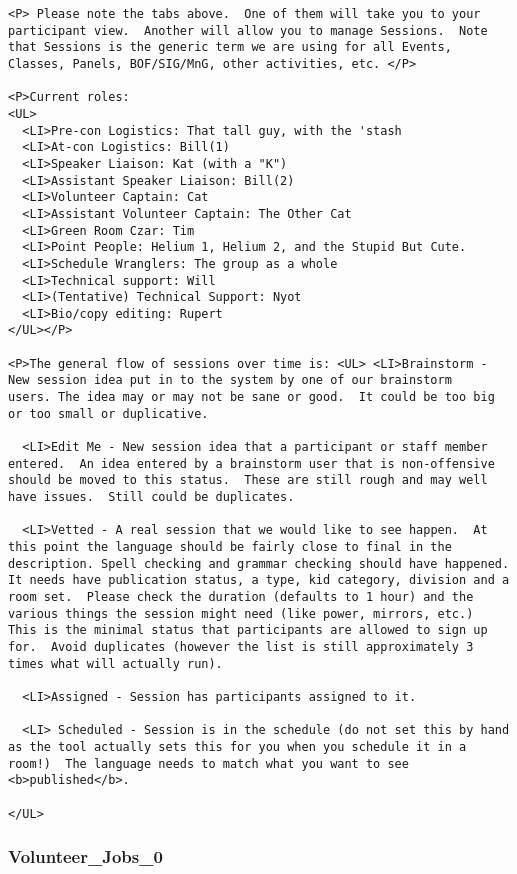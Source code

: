 \documentclass[tablesignature]{scrartcl}
\begin{document}
\begin{verbatim}
<P> Please note the tabs above.  One of them will take you to your
participant view.  Another will allow you to manage Sessions.  Note
that Sessions is the generic term we are using for all Events,
Classes, Panels, BOF/SIG/MnG, other activities, etc. </P>

<P>Current roles:
<UL>
  <LI>Pre-con Logistics: That tall guy, with the 'stash
  <LI>At-con Logistics: Bill(1)
  <LI>Speaker Liaison: Kat (with a "K")
  <LI>Assistant Speaker Liaison: Bill(2)
  <LI>Volunteer Captain: Cat
  <LI>Assistant Volunteer Captain: The Other Cat
  <LI>Green Room Czar: Tim
  <LI>Point People: Helium 1, Helium 2, and the Stupid But Cute.
  <LI>Schedule Wranglers: The group as a whole
  <LI>Technical support: Will
  <LI>(Tentative) Technical Support: Nyot
  <LI>Bio/copy editing: Rupert
</UL></P>

<P>The general flow of sessions over time is: <UL> <LI>Brainstorm -
New session idea put in to the system by one of our brainstorm
users. The idea may or may not be sane or good.  It could be too big
or too small or duplicative.

  <LI>Edit Me - New session idea that a participant or staff member
entered.  An idea entered by a brainstorm user that is non-offensive
should be moved to this status.  These are still rough and may well
have issues.  Still could be duplicates.

  <LI>Vetted - A real session that we would like to see happen.  At
this point the language should be fairly close to final in the
description. Spell checking and grammar checking should have happened.
It needs have publication status, a type, kid category, division and a
room set.  Please check the duration (defaults to 1 hour) and the
various things the session might need (like power, mirrors, etc.)
This is the minimal status that participants are allowed to sign up
for.  Avoid duplicates (however the list is still approximately 3
times what will actually run).

  <LI>Assigned - Session has participants assigned to it.

  <LI> Scheduled - Session is in the schedule (do not set this by hand
as the tool actually sets this for you when you schedule it in a
room!)  The language needs to match what you want to see
<b>published</b>.

</UL>
\end{verbatim}
\subsubsection{Volunteer\_{}Jobs\_{}0}
\label{sec-3_5_5}
\end{document}
